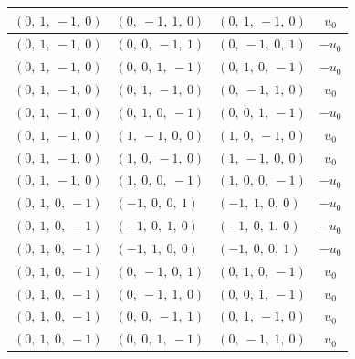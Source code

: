 \documentclass[11pt]{article}
\theoremstyle{definition}
\begin{document}
\begin{longtable}{|l|l|l|c|}
    \hline
    $\left( 0, \  1, \  -1, \  0\right)$ & $\left( 0, \  -1, \  1, \  0\right)$ & $\left( 0, \  1, \  -1, \  0\right)$ & $u_{0}$ \\
    \hline
    $\left( 0, \  1, \  -1, \  0\right)$ & $\left( 0, \  0, \  -1, \  1\right)$ & $\left( 0, \  -1, \  0, \  1\right)$ & $- u_{0}$ \\
    \hline
    $\left( 0, \  1, \  -1, \  0\right)$ & $\left( 0, \  0, \  1, \  -1\right)$ & $\left( 0, \  1, \  0, \  -1\right)$ & $- u_{0}$ \\
    \hline
    $\left( 0, \  1, \  -1, \  0\right)$ & $\left( 0, \  1, \  -1, \  0\right)$ & $\left( 0, \  -1, \  1, \  0\right)$ & $u_{0}$ \\
    \hline
    $\left( 0, \  1, \  -1, \  0\right)$ & $\left( 0, \  1, \  0, \  -1\right)$ & $\left( 0, \  0, \  1, \  -1\right)$ & $- u_{0}$ \\
    \hline
    $\left( 0, \  1, \  -1, \  0\right)$ & $\left( 1, \  -1, \  0, \  0\right)$ & $\left( 1, \  0, \  -1, \  0\right)$ & $u_{0}$ \\
    \hline
    $\left( 0, \  1, \  -1, \  0\right)$ & $\left( 1, \  0, \  -1, \  0\right)$ & $\left( 1, \  -1, \  0, \  0\right)$ & $u_{0}$ \\
    \hline
    $\left( 0, \  1, \  -1, \  0\right)$ & $\left( 1, \  0, \  0, \  -1\right)$ & $\left( 1, \  0, \  0, \  -1\right)$ & $- u_{0}$ \\
    \hline
    $\left( 0, \  1, \  0, \  -1\right)$ & $\left( -1, \  0, \  0, \  1\right)$ & $\left( -1, \  1, \  0, \  0\right)$ & $- u_{0}$ \\
    \hline
    $\left( 0, \  1, \  0, \  -1\right)$ & $\left( -1, \  0, \  1, \  0\right)$ & $\left( -1, \  0, \  1, \  0\right)$ & $- u_{0}$ \\
    \hline
    $\left( 0, \  1, \  0, \  -1\right)$ & $\left( -1, \  1, \  0, \  0\right)$ & $\left( -1, \  0, \  0, \  1\right)$ & $- u_{0}$ \\
    \hline
    $\left( 0, \  1, \  0, \  -1\right)$ & $\left( 0, \  -1, \  0, \  1\right)$ & $\left( 0, \  1, \  0, \  -1\right)$ & $u_{0}$ \\
    \hline
    $\left( 0, \  1, \  0, \  -1\right)$ & $\left( 0, \  -1, \  1, \  0\right)$ & $\left( 0, \  0, \  1, \  -1\right)$ & $u_{0}$ \\
    \hline
    $\left( 0, \  1, \  0, \  -1\right)$ & $\left( 0, \  0, \  -1, \  1\right)$ & $\left( 0, \  1, \  -1, \  0\right)$ & $u_{0}$ \\
    \hline
    $\left( 0, \  1, \  0, \  -1\right)$ & $\left( 0, \  0, \  1, \  -1\right)$ & $\left( 0, \  -1, \  1, \  0\right)$ & $u_{0}$ \\

\end{longtable}
\end{document}
